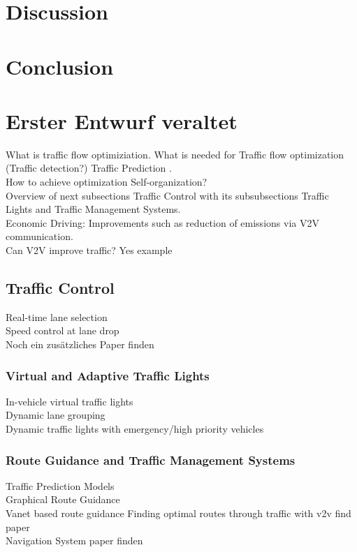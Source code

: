 \documentclass{sig-alternate}
\begin{document}
\section{Discussion}
\section{Conclusion}




\section{Erster Entwurf veraltet}

What is traffic flow optimiziation. What is needed for Traffic flow optimization (Traffic detection?) Traffic Prediction \cite{6856591}. \\ How to achieve optimization Self-organization?\cite{5625236} \\Overview of next subsections Traffic Control with its subsubsections Traffic Lights and Traffic Management Systems. \\
Economic Driving: Improvements such as reduction of emissions via V2V communication.  \\
Can V2V  improve traffic?  Yes example\cite{6856462}
\subsection{Traffic Control}
Real-time lane selection\cite{6856515} \\
Speed control at lane drop \cite{1614269.1614274}\\
Noch ein zusätzliches Paper finden\\
\subsubsection{Virtual and Adaptive Traffic Lights}
In-vehicle virtual traffic lights\cite{ferreira2010self}  \cite{gradinescu2007adaptive} \\ 
Dynamic lane grouping \cite{6338840} \\
Dynamic traffic lights with emergency/high priority vehicles \cite{6799827} \\
\subsubsection{Route Guidance and Traffic Management Systems}
Traffic Prediction Models \cite{6685576} \\
Graphical Route Guidance \cite{5410169} \\
Vanet based route guidance \cite{6799873}
Finding optimal routes through traffic with v2v  find paper \\
Navigation System paper finden\\
\end{document}
